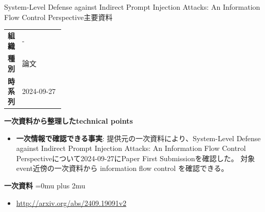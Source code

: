 \begin{technicalnote}{System-Level Defense against Indirect Prompt Injection Attacks: An Information Flow Control Perspective}{主要資料}
\begingroup
\begin{tabularx}{\linewidth}{@{}>{\bfseries}p{0.22\linewidth}X@{}}
組織 & - \\
種別 & 論文 \\
時系列 & 2024-09-27 \\
\end{tabularx}
\smallskip
{\bfseries 一次資料から整理したtechnical points}
\begin{itemize}[leftmargin=1.5em,itemsep=0.35em]
\item \textbf{一次情報で確認できる事実}: 提供元の一次資料により、System-Level Defense against Indirect Prompt Injection Attacks: An Information Flow Control Perspectiveについて2024-09-27にPaper First Submissionを確認した。 対象event近傍の一次資料から information flow control を確認できる。
\end{itemize}
\begin{minipage}{\linewidth}
\begin{samepage}
{\bfseries 一次資料}
\begingroup\sloppy
\Urlmuskip=0mu plus 2mu\relax
\begin{itemize}[leftmargin=1.5em,itemsep=0.25em]
\item {\scriptsize\url{http://arxiv.org/abs/2409.19091v2}}
\end{itemize}
\endgroup
\end{samepage}
\end{minipage}
\endgroup
\end{technicalnote}
\medskip

